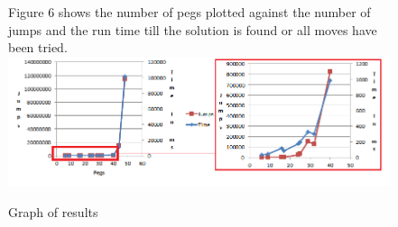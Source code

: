 \documentclass[11pt]{article}
\begin{document}
\begin{figure}
Figure 6 shows the number of pegs plotted against the number of jumps and the run time till the solution is found or all moves have been tried.\newline
\newline
\includegraphics[width=15cm]{7}
\caption{Graph of results} 
\label{fig: 6}


\end{figure}
\end{document}
